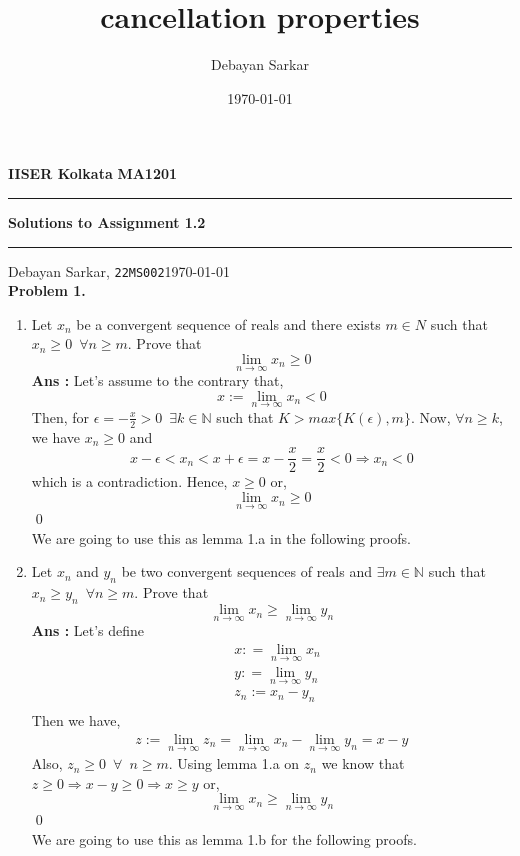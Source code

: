 \documentclass[10pt]{article}
\title{cancellation properties}
\author{Debayan Sarkar}
\date{\today}
\newcommand{\inflim}{\lim_{n\to\infty}}
\newcommand{\sol}{\textbf{Ans : }}
\begin{document}
        \par\textbf{IISER Kolkata} \hfill \textbf{MA1201}
        \vspace{3pt}
        \hrule
        \vspace{3pt}
        \begin{center}
                \LARGE{\textbf{Solutions to Assignment 1.2}}
        \end{center}
        \vspace{3pt}
        \hrule
        \vspace{3pt}
        Debayan Sarkar, \texttt{22MS002}\hfill\today
        \vspace{20pt}\\
        \textbf{Problem 1.}
        \begin{enumerate}[label = {(\alph*)}]
        \item Let $x_n$ be a convergent sequence of reals and there exists $m \in N$ such that $x_n \geq 0 \,\,\, \forall n \geq m$. Prove that $$ \lim_{n\to\infty}x_n \geq 0$$
        \sol Let's assume to the contrary that, $$x:=\lim_{n\to\infty} x_n < 0$$ Then, for $\epsilon = -\frac{x}{2} > 0 \,\,\, \exists k \in \mathbb{N}$ such that $K > max\{K(\epsilon), m\}$. Now, $\forall n \geq k$, we have $x_n \geq 0$ and $$x - \epsilon < x_n < x + \epsilon = x - \frac{x}{2} = \frac{x}{2} < 0 \Rightarrow x_n < 0 $$ which is a contradiction. Hence, $x \geq 0$ or, $$\lim_{n\to\infty} x_n \geq 0$$ \qed \\ We are going to use this as lemma 1.a in the following proofs.
        \item Let $x_n$ and $y_n$ be two convergent sequences of reals and $\exists m \in \mathbb{N}$ such that $x_n \geq y_n \,\,\, \forall n \geq m$. Prove that $$\lim_{n\to\infty} x_n \geq \lim_{n\to\infty} y_n$$
        \sol Let's define 
        \begin{align*}
            &x : = \inflim x_n\\
            &y : = \inflim y_n\\
            &z_n := x_n - y_n\\
        \end{align*}
        Then we have,
        \begin{align*}
            z := \inflim z_n = \inflim x_n - \inflim y_n  = x - y 
        \end{align*}
        Also, $z_n \geq 0 \,\,\,\forall \,\,\,n \geq m$. Using lemma 1.a on $z_n$ we know that $z \geq 0 \Rightarrow x - y \geq 0 \Rightarrow x \geq y$ or, $$\inflim x_n \geq \inflim y_n$$ \qed \\ We are going to use this as lemma 1.b for the following proofs.

\end{enumerate}
\end{document}
